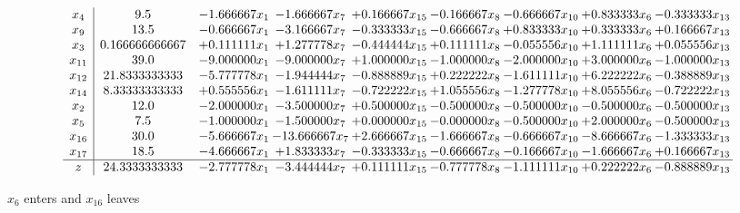 \documentclass[10pt]{article}
\begin{document}
 \[\begin{array}{c| c c@{\hskip 2pt} c@{\hskip 2pt} c@{\hskip 2pt} c@{\hskip 2pt} c@{\hskip 2pt} c@{\hskip 2pt} c@{\hskip 2pt} }
 x_{4}   &  9.5 & -1.666667 x_{1} & -1.666667 x_{7} & + 0.166667 x_{15} & -0.166667 x_{8} & -0.666667 x_{10} & + 0.833333 x_{6} & -0.333333 x_{13}\\
 x_{9}   &  13.5 & -0.666667 x_{1} & -3.166667 x_{7} & -0.333333 x_{15} & -0.666667 x_{8} & + 0.833333 x_{10} & + 0.333333 x_{6} & + 0.166667 x_{13}\\
 x_{3}   &  0.166666666667 & + 0.111111 x_{1} & + 1.277778 x_{7} & -0.444444 x_{15} & + 0.111111 x_{8} & -0.055556 x_{10} & + 1.111111 x_{6} & + 0.055556 x_{13}\\
 x_{11}   &  39.0 & -9.000000 x_{1} & -9.000000 x_{7} & + 1.000000 x_{15} & -1.000000 x_{8} & -2.000000 x_{10} & + 3.000000 x_{6} & -1.000000 x_{13}\\
 x_{12}   &  21.8333333333 & -5.777778 x_{1} & -1.944444 x_{7} & -0.888889 x_{15} & + 0.222222 x_{8} & -1.611111 x_{10} & + 6.222222 x_{6} & -0.388889 x_{13}\\
 x_{14}   &  8.33333333333 & + 0.555556 x_{1} & -1.611111 x_{7} & -0.722222 x_{15} & + 1.055556 x_{8} & -1.277778 x_{10} & + 8.055556 x_{6} & -0.722222 x_{13}\\
 x_{2}   &  12.0 & -2.000000 x_{1} & -3.500000 x_{7} & + 0.500000 x_{15} & -0.500000 x_{8} & -0.500000 x_{10} & -0.500000 x_{6} & -0.500000 x_{13}\\
 x_{5}   &  7.5 & -1.000000 x_{1} & -1.500000 x_{7} & + 0.000000 x_{15} & -0.000000 x_{8} & -0.500000 x_{10} & + 2.000000 x_{6} & -0.500000 x_{13}\\
 x_{16}   &  30.0 & -5.666667 x_{1} & -13.666667 x_{7} & + 2.666667 x_{15} & -1.666667 x_{8} & -0.666667 x_{10} & -8.666667 x_{6} & -1.333333 x_{13}\\
 x_{17}   &  18.5 & -4.666667 x_{1} & + 1.833333 x_{7} & -0.333333 x_{15} & -0.666667 x_{8} & -0.166667 x_{10} & -1.666667 x_{6} & + 0.166667 x_{13}\\
\hline
z    &  24.3333333333 & -2.777778 x_{1} & -3.444444 x_{7} & + 0.111111 x_{15} & -0.777778 x_{8} & -1.111111 x_{10} & + 0.222222 x_{6} & -0.888889 x_{13}\\
\end{array}\]


 $ x_{6} $ enters and $ x_{16} $ leaves 
\end{document}
